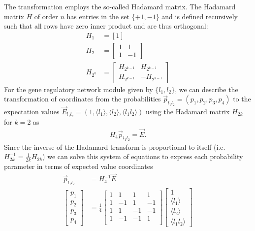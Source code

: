 \documentclass[10pt]{article}
\begin{document}
The transformation employs the so-called Hadamard matrix. The Hadamard matrix $H$ of order $n$ has entries in the set $\{+1,-1\}$ and is defined recursively such that all rows have zero inner product and are thus orthogonal:
\begin{equation}
\begin{aligned}\label{eq:hadamard}
H_1 &= [1]\\
H_2 &= \begin{bmatrix}
1 & 1\\
1 & -1
\end{bmatrix}\\
H_{2^k} &= \begin{bmatrix}
H_{2^{k-1}} & H_{2^{k-1}}\\
H_{2^{k-1}} & -H_{2^{k-1}}
\end{bmatrix}
\end{aligned}
\end{equation}
For the gene regulatory network module given by $\{l_1,l_2\}$, we can describe the transformation of coordinates from the probabilities $\vec{p}_{l_1 l_2} = (p_1, p_2, p_3, p_4)$ to the expectation values $\vec{E}_{l_1 l_2} = (1, \langle l_1 \rangle, \langle l_2 \rangle, \langle l_1 l_2 \rangle)$ using the Hadamard matrix $H_{2k}$ for $k=2$ as
\begin{equation}
\begin{aligned}\label{eq:expecttrans}
H_4 \vec{p}_{l_1 l_2} = \vec{E}.
\end{aligned}
\end{equation}
Since the inverse of the Hadamard transform is proportional to itself (i.e. $H_{2k}^{-1} = \frac{1}{2k}H_{2k}$) we can solve this system of equations to express each probability parameter in terms of expected value coordinates
\begin{equation}
\begin{aligned}\label{eq:expecttransfull}
\vec{p}_{l_1 l_2} &= H_4^{-1}\vec{E}\\
\begin{bmatrix}
p_1\\
p_2\\
p_3\\
p_4
\end{bmatrix} &= \frac{1}{4}\begin{bmatrix}
  1 & 1 & 1 & 1\\
  1 & -1 & 1 & -1\\
  1 & 1 & -1 & -1\\
  1 & -1 & -1 & 1\\
\end{bmatrix} \begin{bmatrix}
1\\
\langle l_1 \rangle\\
\langle l_2 \rangle\\
\langle l_1 l_2 \rangle
\end{bmatrix}
\end{aligned}
\end{equation}
\end{document}
